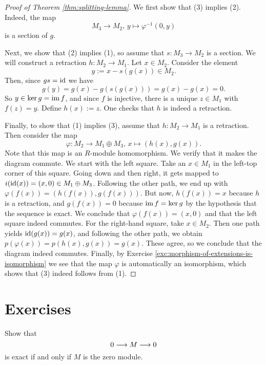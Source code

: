 \begin{proof}[Proof of Theorem \ref{thm:splitting-lemma}]
We first show that (3) implies (2). Indeed, the map
\[
	M_3 \to M_2,\, y \mapsto \varphi^{-1}(0,y)
\]
is a section of $g$.

Next, we show that (2) implies (1), so assume that $s\colon M_3\to M_2$ is a section. We will construct a retraction $h\colon M_2 \to M_1$. Let $x\in M_2$. Consider the element
\[
	y := x - s(g(x)) \in M_2.
\]
Then, since $gs={\rm id}$ we have
\[
	g(y) = g(x) - g(s(g(x))) = g(x) - g(x) = 0.
\]
So $y \in \ker g = \operatorname{im} f$, and since $f$ is injective, there is a {unique} $z\in M_1$ with $f(z)=y$. Define $h(x) := z$. One checks that $h$ is indeed a retraction.

Finally, to show that (1) implies (3), assume that $h\colon M_2 \to M_1$ is a retraction. Then consider the map
\[
	\varphi\colon M_2 \to M_1 \oplus M_3,\,
	x \mapsto (h(x), g(x)).
\]
Note that this map is an $R$-module homomorphism. We verify that it makes the diagram commute. We start with the left square. Take an $x\in M_1$ in the left-top corner of this square. Going down and then right, it gets mapped to $i({\rm id} (x)) = (x,0) \in M_1 \oplus M_3$. Following the other path, we end up with
$ \varphi(f(x))= (h(f(x)),g(f(x)))$. But now, $h(f(x))=x$ because $h$ is a retraction, and $g(f(x))=0$ because $\operatorname{im} f = \ker g$ by the hypothesis that the sequence is exact. We conclude that $\varphi(f(x))=(x,0)$ and that the left square indeed commutes. For the right-hand square, take $x\in M_2$. Then one path yields ${\rm id}(g(x)) = g(x)$, and following the other path, we obtain $p(\varphi(x))=p(h(x),g(x))=g(x)$. These agree, so we conclude that the diagram indeed commutes. Finally, by Exercise \ref{exc:morphism-of-extensions-is-isomorphism} we see that the map $\varphi$ is automatically an isomorphism, which shows that (3) indeed follows from (1).
\end{proof}






\newpage
\section*{Exercises}




\begin{exercise}Show that
\[
	0 \longrightarrow M \longrightarrow 0
\]
is exact if and only if $M$ is the zero module.
\end{exercise}

